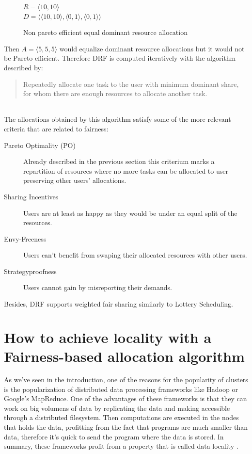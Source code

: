 \documentclass{report}                     %
\begin{document}
\begin{figure}[!ht]
\centering
$R = \langle 10, 10 \rangle$ \\
$D = \langle \langle 10, 10 \rangle, \langle 0, 1 \rangle, \langle 0, 1 \rangle \rangle$ \\
\caption{Non pareto efficient equal dominant resource allocation}
\label{fig:nonpareto}
\end{figure}

Then $A = \langle 5, 5, 5 \rangle$ would equalize dominant resource
allocations but it would not be Pareto efficient. Therefore DRF is computed
iteratively with the algorithm described by: \\

\blockquote{Repeatedly allocate one task to the user with minimum dominant
share, for whom there are enough resources to allocate another task.} \\

The allocations obtained by this algorithm satisfy some of the more
relevant criteria that are related to fairness: \\

\begin{description}
  \item[Pareto Optimality (PO)] Already described in the previous
  section this criterium marks a repartition of resources where
  no more tasks can be allocated to user preserving other users'
  allocations.
  \item[Sharing Incentives]  Users are at least as happy as they
  would be under an equal split of the resources.
  \item[Envy-Freeness] Users can't benefit from swaping their
  allocated resources with other users.
  \item[Strategyproofness] Users cannot gain by misreporting
  their demands.
\end{description}

Besides, DRF supports weighted fair sharing similarly to Lottery
Scheduling. 

\section {How to achieve locality with a Fairness-based allocation algorithm}
\label{sec:delayscheduling}

As we've seen in the introduction, one of the reasons for the
popularity of clusters is the popularization of distributed data
processing frameworks like Hadoop or Google's MapReduce. One of the
advantages of these frameworks is that they can work on big volumens
of data by replicating the data and making accessible through a
distributed filesystem. Then computations are executed in the nodes
that holds the data, profitting from the fact that programs are much
smaller than data, therefore it's quick to send the program where the
data is stored. In summary, these frameworks profit from a property
that is called data locality \cite{chung_maximizing_2006}.
\end{document}

